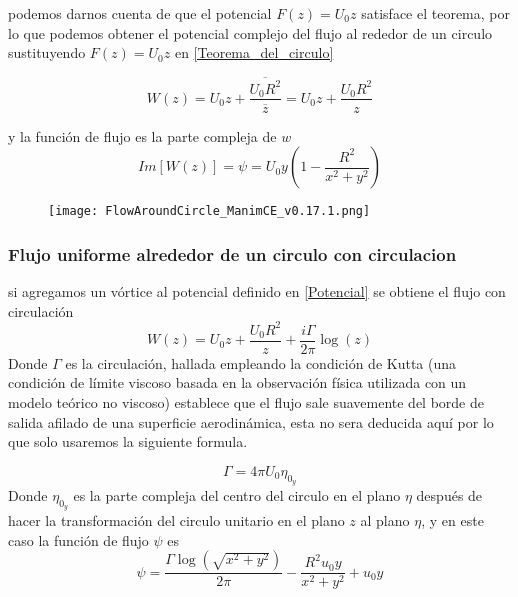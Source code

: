 \documentclass[12pt]{article}
\begin{document}
		podemos darnos cuenta de que el potencial $F(z)= U_0 z$ satisface el teorema, por lo que podemos obtener el potencial complejo  del flujo al rededor de un circulo sustituyendo $F(z)= U_0 z$ en \ref*{Teorema_del_circulo} 

		\begin{equation}
			W(z) = U_0 z + \frac{\overline{U_0 R^2} }{\overline{z} } = U_0 z +\frac{U_0 R^2}{z} 
		\end{equation}

		y la función de flujo es la parte compleja de $w$
		\begin{equation}
			Im[W(z)]=\psi =  U_0 y \left( 1- \frac{R^2}{x^2 + y^2}\right)
			\label{Potencial}
		\end{equation}
		

		\begin{figure}[!h]
			\begin{small}
				\begin{center}
					\texttt{[image: FlowAroundCircle\_ManimCE\_v0.17.1.png]}
				\end{center}
				\caption{}
			\end{small}
		\end{figure}
		
		\subsubsection{Flujo uniforme alrededor de un circulo con circulacion}
			si agregamos un vórtice al potencial definido en \ref{Potencial} se obtiene el flujo con circulación
			\begin{equation}
				W(z) = U_0z + \frac{ U_0R^2}{z} + \frac{i \Gamma}{2 \pi}\log (z)
			\end{equation}
			Donde  $\Gamma$ es la circulación, hallada empleando la condición de Kutta (una condición de límite viscoso basada en la observación física utilizada con un modelo teórico no viscoso) establece que el flujo sale suavemente del borde de salida afilado de una superficie aerodinámica, esta no sera deducida aquí por lo que solo usaremos la siguiente formula.

			\begin{equation}
				\Gamma=4 \pi U_0 \eta_{0_y}
			\end{equation}
			Donde $\eta_{0_y}$ es la parte compleja del centro del circulo en el plano $\eta$ después de hacer la transformación del circulo unitario en el plano $z$ al plano $\eta$, y en este caso la función de flujo $ \psi $ es 
			\begin{equation}
				\psi = \frac{\Gamma \log{\left(\sqrt{x^{2} + y^{2}} \right)}}{2 \pi} - \frac{R^{2} u_{0} y}{x^{2} + y^{2}} + u_{0} y
			\end{equation}
\end{document}
